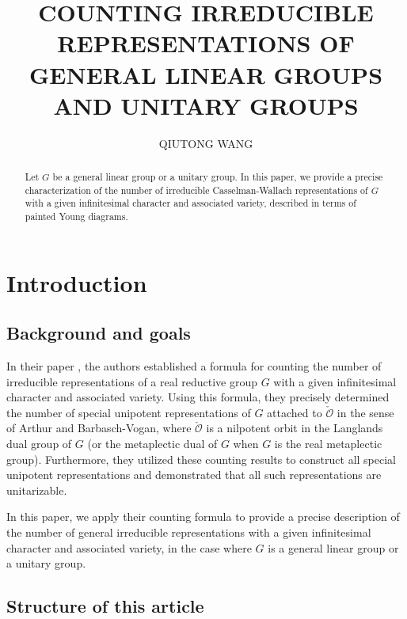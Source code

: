 \documentclass[12pt, a4paper]{amsart}
\author[QIUTONG WANG]{QIUTONG WANG}
\numberwithin{equation}{section}
\newcommand{\CO}{{\mathcal {O}}}
\begin{document}
\title[COUNTING IRREDUCIBLE REPRESENTATIONS]{COUNTING IRREDUCIBLE REPRESENTATIONS OF GENERAL LINEAR GROUPS AND UNITARY GROUPS}
\maketitle

\begin{abstract}
    Let $G$ be a general linear group or a unitary group. In this paper, we provide a precise characterization of the number of irreducible Casselman-Wallach representations of $G$ with a given infinitesimal character and associated variety, described in terms of painted Young diagrams.
\end{abstract}

\tableofcontents



\section{Introduction}

\subsection{Background and goals}

In their paper \cite{BMSZ}, the authors established a formula for counting the number of irreducible representations of a real reductive group $G$ with a given infinitesimal character and associated variety. Using this formula, they precisely determined the number of special unipotent representations of $G$ attached to $\check{\CO}$ in the sense of Arthur and Barbasch-Vogan, where $\check{\CO}$ is a nilpotent orbit in the Langlands dual group of $G$ (or the metaplectic dual of $G$ when $G$ is the real metaplectic group). Furthermore, they utilized these counting results to construct all special unipotent representations and demonstrated that all such representations are unitarizable.

In this paper, we apply their counting formula to provide a precise description of the number of general irreducible representations with a given infinitesimal character and associated variety, in the case where $G$ is a general linear group or a unitary group.

\subsection{Structure of this article}
\end{document}
